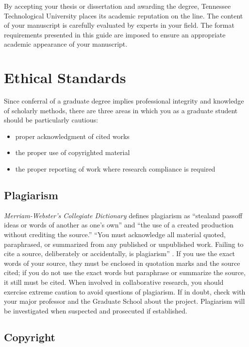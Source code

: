 By accepting your thesis or dissertation and awarding the degree,
Tennessee Technological University places its academic reputation on
the line. The content of your manuscript is carefully evaluated by
experts in your field. The format requirements presented in this guide
are imposed to ensure an appropriate academic appearance of your
manuscript.


\section{Ethical Standards}
\label{sec:EthicalStandards}

Since conferral of a graduate degree implies professional integrity
and knowledge of scholarly methods, there are three areas in which you
as a graduate student should be particularly cautious:

\begin{itemize}
\item proper acknowledgment of cited works
\item the proper use of copyrighted material
\item the proper reporting of work where research compliance is required
\end{itemize}

\subsection{Plagiarism}
\label{sec:Plagiarism}

\textit{Merriam-Webster's Collegiate Dictionary} \cite{webster1993}
defines plagiarism as ``steal\-[ing] and pass\-[ing] off ideas or
words of another as one's own'' and ``the use of a created production
without crediting the source.'' ``You must acknowledge all material
quoted, paraphrased, or summarized from any published or unpublished
work.  Failing to cite a source, deliberately or accidentally, is
plagiarism'' \cite[424]{webster1993}. If you use the exact words of
your source, they must be enclosed in quotation marks and the source
cited; if you do not use the exact words but paraphrase or summarize
the source, it still must be cited.  When involved in collaborative
research, you should exercise extreme caution to avoid questions of
plagiarism. If in doubt, check with your major professor and the
Graduate School about the project. Plagiarism will be investigated
when suspected and prosecuted if established.


\subsection{Copyright}
\label{sec:Copyright}

